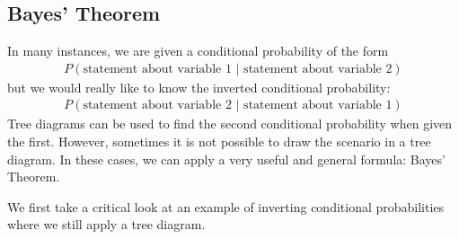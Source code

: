 \subsection{Bayes' Theorem}
\label{bayesTheoremSubsection}


In many instances, we are given a conditional probability of the form
\begin{align*}
P(\text{statement about variable 1 } | \text{ statement about variable 2})
\end{align*}
but we would really like to know the inverted conditional probability:
\begin{align*}
P(\text{statement about variable 2 } | \text{ statement about variable 1})
\end{align*}
Tree diagrams can be used to find the second conditional probability when given the first. However, sometimes it is not possible to draw the scenario in a tree diagram. In these cases, we can apply a very useful and general formula: Bayes' Theorem.

We first take a critical look at an example of inverting conditional probabilities where we still apply a tree diagram.

